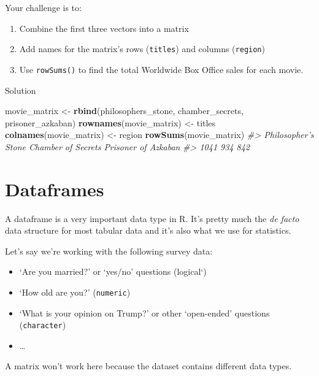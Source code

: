 \documentclass[]{book}
\newenvironment{Shaded}{\begin{snugshade}}{\end{snugshade}}
\newcommand{\KeywordTok}[1]{\textcolor[rgb]{0.13,0.29,0.53}{\textbf{#1}}}
\newcommand{\StringTok}[1]{\textcolor[rgb]{0.31,0.60,0.02}{#1}}
\newcommand{\CommentTok}[1]{\textcolor[rgb]{0.56,0.35,0.01}{\textit{#1}}}
\newcommand{\NormalTok}[1]{#1}
\providecommand{\tightlist}{%
  \setlength{\itemsep}{0pt}\setlength{\parskip}{0pt}}
\begin{document}
Your challenge is to:

\begin{enumerate}
\def\labelenumi{\arabic{enumi}.}
\tightlist
\item
  Combine the first three vectors into a matrix
\item
  Add names for the matrix's rows (\texttt{titles}) and columns
  (\texttt{region})
\item
  Use \texttt{rowSums()} to find the total Worldwide Box Office sales
  for each movie.
\end{enumerate}

Solution

\begin{Shaded}
\begin{Highlighting}[]
\NormalTok{movie_matrix <-}\StringTok{ }\KeywordTok{rbind}\NormalTok{(philosophers_stone, chamber_secrets, prisoner_azkaban)}
\KeywordTok{rownames}\NormalTok{(movie_matrix) <-}\StringTok{ }\NormalTok{titles}
\KeywordTok{colnames}\NormalTok{(movie_matrix) <-}\StringTok{ }\NormalTok{region}
\KeywordTok{rowSums}\NormalTok{(movie_matrix)}
\CommentTok{#> Philosopher's Stone  Chamber of Secrets Prisoner of Azkaban }
\CommentTok{#>                1041                 934                 842}
\end{Highlighting}
\end{Shaded}

\hypertarget{dataframes}{\section{Dataframes}\label{dataframes}}

A dataframe is a very important data type in R. It's pretty much the
\emph{de facto} data structure for most tabular data and it's also what
we use for statistics.

Let's say we're working with the following survey data:

\begin{itemize}
\tightlist
\item
  `Are you married?' or `yes/no' questions (logical`)
\item
  `How old are you?' (\texttt{numeric})
\item
  `What is your opinion on Trump?' or other `open-ended' questions
  (\texttt{character})
\item
  \ldots{}
\end{itemize}

A matrix won't work here because the dataset contains different data
types.
\end{document}
